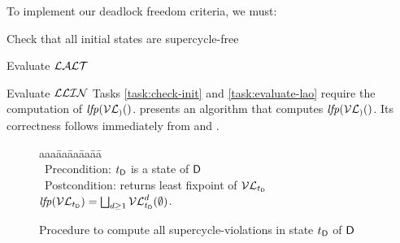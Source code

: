 To implement our deadlock freedom criteria, we must:
\bn
\item \label{task:check-init} Check that all initial states are supercycle-free
\item \label{task:evaluate-lao} Evaluate $\mathcal{LALT}$
\item \label{task:evaluate-llin} Evaluate $\mathcal{LLIN}$
\en
%
Tasks \ref{task:check-init} and \ref{task:evaluate-lao} require the computation of $\lfp{\lVFs}$.
 presents an algorithm that computes
$\lfp{\lVFs}$. Its correctness follows immediately from  and .


   \label{secn:computeLFP}
%   

\newcommand{\fpt}{\mathit{fixpoint}}
\newcommand{\VLA}[5]{\ensuremath{\MATHIDN{V_{\dsk{#1}{#2},#3} [#4 #5]}}}    %

\begin{figure}[H]
\setcounter{lctr}{0}
\begin{tabbing}\label{alg:compute-lfp}
aaa\= aa\= aa\= aa\= aa\=\kill
\cLFP{$\dsk{\act}{\l},\tD$}\\
\cmnt\ Precondition: $t_\mathsf{D}$ is a state of $\mathsf{D}$\\
\cmnt\ Postcondition: returns least fixpoint of $\mathcal{VL}_{t_\mathsf{D}}$ \ie $\mathit{lfp}(\mathcal{VL}_{t_\mathsf{D}}) = \bigsqcup_{d \ge 1} \mathcal{VL}_{t_\mathsf{D}}^{d}(\emptyset)$.\\

\lio{\XS \gts \ewfg;}

\lio{\REPEAT}
   \lit{\XS \gts \YS}
\lio{\UNTIL\ \XS = \YS;}

\lion{\RETURNE{\XS}}
\end{tabbing}
\caption{Procedure to compute all supercycle-violations in state $t_\mathsf{D}$ of $\mathsf{D}$}
\label{fig:algcomputeLFP}
\end{figure}





